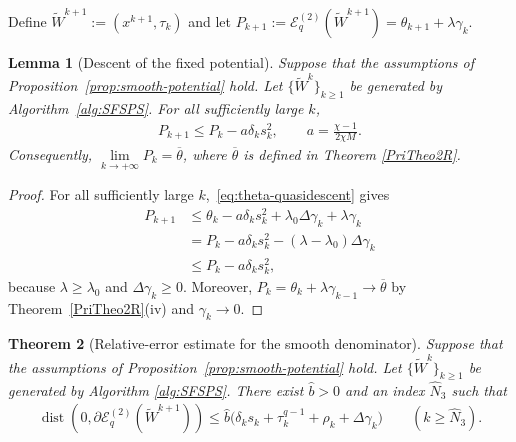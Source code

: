 \documentclass[9pt]{article}
\numberwithin{equation}{section}
\newtheorem{theorem}{Theorem}[section]
\newtheorem{lemma}[theorem]{Lemma}
\theoremstyle{definition}
\theoremstyle{remark}
\newcommand{\Ecal}{\mathcal E}
\DeclareMathOperator{\dist}{dist}
\begin{document}
\medskip
\medskip


Define $\widetilde W^{k+1}:=(x^{k+1},\tau_k)$ and let
$
 P_{k+1}:=\Ecal_q^{(2)}(\widetilde W^{k+1})
         =\theta_{k+1}+\lambda\gamma_k.
$




\begin{lemma}[Descent of the fixed potential]\label{lem:smooth-fixed-descent}
Suppose that the assumptions of
Proposition~\ref{prop:smooth-potential} hold. Let
$\{\widetilde W^k\}_{k\geq1}$ be generated by
Algorithm~\ref{alg:SFSPS}.
For all sufficiently large $k$,
\begin{eqnarray}\label{eq:P-descent}
 P_{k+1}\leq P_k-a\delta_ks_k^2,\qquad a=\frac{\chi-1}{2\chi M}.
\end{eqnarray}
Consequently, $\lim\limits_{k \to +\infty} P_k=\overline \theta$, where $\overline\theta$ is defined in Theorem \ref{PriTheo2R}.
\end{lemma}
\begin{proof}
For all sufficiently large $k$,~\eqref{eq:theta-quasidescent} gives
\[
 \begin{aligned}
 P_{k+1}
 &\leq\theta_k-a\delta_ks_k^2
       +\lambda_0\Delta\gamma_k+\lambda\gamma_k\\
 &=P_k-a\delta_ks_k^2-(\lambda-\lambda_0)\Delta\gamma_k\\
 &\leq P_k-a\delta_ks_k^2,
 \end{aligned}
\]
because $\lambda\geq\lambda_0$ and $\Delta\gamma_k\geq0$.
Moreover, $P_k=\theta_k+\lambda\gamma_{k-1}\to\overline\theta$
by Theorem~\ref{PriTheo2R}(iv) and $\gamma_k\to0$.
\end{proof}
\begin{theorem}[Relative-error estimate for the smooth denominator]\label{residualDiffF}
Suppose that the assumptions of Proposition~\ref{prop:smooth-potential} hold.
Let $\{\widetilde W^k\}_{k\geq1}$ be generated by Algorithm \ref{alg:SFSPS}.
There exist $\widehat b>0$ and an index $\widehat N_3$ such that
\begin{eqnarray}\label{eq:E2-relative-error}
 \dist\!\left(0,\partial\Ecal_q^{(2)}(\widetilde W^{k+1})\right)
 \leq\widehat b\bigl(\delta_ks_k+\tau_k^{q-1}+\rho_k+\Delta\gamma_k\bigr)
 \qquad(k\geq \widehat N_3).
\end{eqnarray}
\end{theorem}
\end{document}
